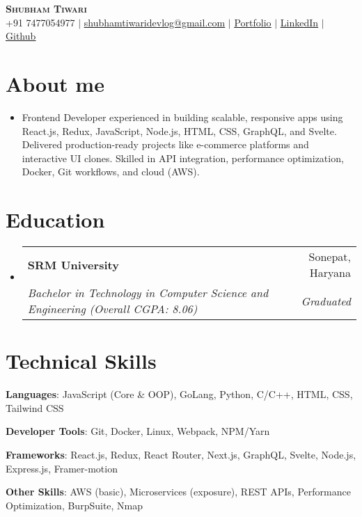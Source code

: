 \documentclass[letterpaper,11pt]{article}
\makeatletter
\newcommand{\resumeItem}[1]{
  \item\small{
    {#1 \vspace{-2pt}}
  }
}
\newcommand{\resumeSubheading}[4]{
  \vspace{-2pt}\item
    \begin{tabular*}{0.97\textwidth}[t]{l@{\extracolsep{\fill}}r}
      \textbf{#1} & #2 \\
      \textit{\small#3} & \textit{\small #4} \\
    \end{tabular*}\vspace{-7pt}
}
\newcommand{\resumeSubHeadingListStart}{\begin{itemize}[leftmargin=0.15in, label={}]}
\newcommand{\resumeSubHeadingListEnd}{\end{itemize}}
\makeatother
\begin{document}
\begin{center}
    \textbf{\Huge \scshape Shubham Tiwari} \\ \vspace{1pt}
    \small +91 7477054977 $|$ \href{mailto: shubhamtiwaridevlog@gmail.com}{\underline{shubhamtiwaridevlog@gmail.com}} $|$ 
    \href{https://portfolio-shubham-dusky.vercel.app/}{\underline{Portfolio}} $|$
    \href{https://www.linkedin.com/in/shubham-dev-tiwari/}{\underline{LinkedIn}} $|$
    \href{https://github.com/shubham-dev-tiwari}{\underline{Github}}
\end{center}


\section{About me}
  \resumeSubHeadingListStart
    \resumeItem{Frontend Developer experienced in building scalable, responsive apps using React.js, Redux, JavaScript, Node.js, HTML, CSS, GraphQL, and Svelte. Delivered production-ready projects like e-commerce platforms and interactive UI clones. Skilled in API integration, performance optimization, Docker, Git workflows, and cloud (AWS).}
  \resumeSubHeadingListEnd

\section{Education}
  \resumeSubHeadingListStart
    \resumeSubheading
      {SRM University}{Sonepat, Haryana}
      {Bachelor in Technology in Computer Science and Engineering (Overall CGPA: 8.06)}{Graduated}
  \resumeSubHeadingListEnd

\section{Technical Skills}
\begin{itemize}[leftmargin=0.15in, label={}, itemsep=-2.5pt]
    \small{\item{\textbf{Languages}{: JavaScript (Core \& OOP), GoLang, Python, C/C++, HTML, CSS, Tailwind CSS}}}
    \small{\item{\textbf{Developer Tools}{: Git, Docker, Linux, Webpack, NPM/Yarn}}}
    \small{\item{\textbf{Frameworks}{: React.js, Redux, React Router, Next.js, GraphQL, Svelte, Node.js, Express.js,
Framer-motion}}}
    \small{\item{\textbf{Other Skills}{: AWS (basic), Microservices (exposure), REST APIs, Performance Optimization, BurpSuite, Nmap}}}
\end{itemize}
\end{document}
